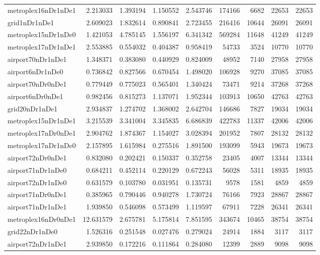 \begin{longtable}{|l|r|r|r|r|r|r|r|r|}
metroplex16nDr1nDe1 & 2.213033 & 1.393194 & 1.150552 & 2.543746 & 174166 & 6682 & 22653 & 22653 \\
grid1nDr1nDe1 & 2.609023 & 1.832614 & 0.890841 & 2.723455 & 216416 & 10644 & 26091 & 26091 \\
metroplex15nDr1nDe0 & 1.421053 & 4.785145 & 1.556197 & 6.341342 & 569284 & 11648 & 41249 & 41249 \\
metroplex17nDr1nDe1 & 2.553885 & 0.554032 & 0.404387 & 0.958419 & 54733 & 3524 & 10770 & 10770 \\
airport70nDr1nDe1 & 1.348371 & 0.383080 & 0.440929 & 0.824009 & 48952 & 7140 & 27958 & 27958 \\
airport6nDr1nDe0 & 0.736842 & 0.827566 & 0.670454 & 1.498020 & 106928 & 9270 & 37085 & 37085 \\
airport70nDr0nDe1 & 0.779449 & 0.775023 & 0.565401 & 1.340424 & 73471 & 9214 & 37268 & 37268 \\
airport6nDr0nDe1 & 0.982456 & 0.815273 & 1.137071 & 1.952344 & 103913 & 10650 & 42763 & 42763 \\
grid20nDr1nDe1 & 2.934837 & 1.274702 & 1.368002 & 2.642704 & 146686 & 7827 & 19034 & 19034 \\
metroplex15nDr1nDe1 & 3.215539 & 3.341004 & 3.345835 & 6.686839 & 422783 & 11337 & 42006 & 42006 \\
metroplex17nDr0nDe1 & 2.904762 & 1.874367 & 1.154027 & 3.028394 & 201952 & 7807 & 28132 & 28132 \\
metroplex17nDr1nDe0 & 2.157895 & 1.615984 & 0.275516 & 1.891500 & 193099 & 5943 & 19673 & 19673 \\
airport72nDr0nDe1 & 0.832080 & 0.202421 & 0.150337 & 0.352758 & 23405 & 4007 & 13344 & 13344 \\
airport71nDr1nDe0 & 0.684211 & 0.452114 & 0.220129 & 0.672243 & 56028 & 5311 & 18935 & 18935 \\
airport72nDr1nDe0 & 0.631579 & 0.103780 & 0.031951 & 0.135731 & 9578 & 1581 & 4859 & 4859 \\
airport71nDr0nDe1 & 0.385965 & 0.790446 & 0.940278 & 1.730724 & 76166 & 7923 & 28867 & 28867 \\
airport71nDr1nDe1 & 1.939850 & 0.546098 & 0.573499 & 1.119597 & 67911 & 7228 & 26341 & 26341 \\
metroplex16nDr0nDe1 & 12.631579 & 2.675781 & 5.175814 & 7.851595 & 343674 & 10465 & 38754 & 38754 \\
grid22nDr1nDe0 & 1.526316 & 0.251548 & 0.027476 & 0.279024 & 24914 & 1884 & 3117 & 3117 \\
airport72nDr1nDe1 & 2.939850 & 0.172216 & 0.111864 & 0.284080 & 12399 & 2889 & 9098 & 9098 \\

\end{longtable}
